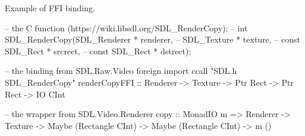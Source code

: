 \documentclass[
  digital, %
  color,   %
  table,   %
  oneside, %
  lof,     %
  lot,     %
]{fithesis3}
\begin{document}
\begin{listing}[H]
\caption{Example of FFI binding.\cite{sdlrepo}}
\label{lst:ffi}
\begin{haskell}
-- the C function (https://wiki.libsdl.org/SDL_RenderCopy):
-- int SDL_RenderCopy(SDL_Renderer * renderer,
--                    SDL_Texture * texture,
--                    const SDL_Rect * srcrect,
--                    const SDL_Rect * dstrect);

-- the binding from SDL.Raw.Video
foreign import ccall "SDL.h SDL_RenderCopy"
    renderCopyFFI :: Renderer
                  -> Texture
                  -> Ptr Rect
                  -> Ptr Rect
                  -> IO CInt

-- the wrapper from SDL.Video.Renderer
copy :: MonadIO m
     => Renderer
     -> Texture
     -> Maybe (Rectangle CInt)
     -> Maybe (Rectangle CInt)
     -> m ()
\end{haskell}
\end{listing}
\end{document}
